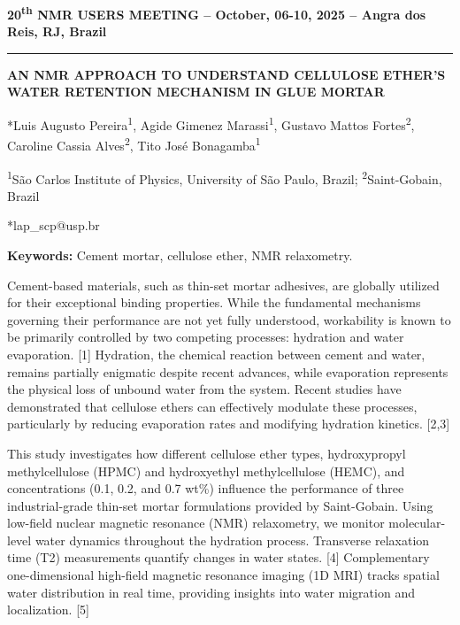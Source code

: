 \documentclass[10pt]{article}
\begin{document}
\centering
\textbf{20\textsuperscript{th} NMR USERS MEETING -- October, 06-10, 2025 -- Angra dos Reis, RJ, Brazil}

\noindent\rule{\textwidth}{0.4pt} %

\vspace{24pt}

\textbf{AN NMR APPROACH TO UNDERSTAND CELLULOSE ETHER’S WATER RETENTION MECHANISM IN GLUE MORTAR}

\vspace{12pt}

*Luis Augusto Pereira\textsuperscript{1}, Agide Gimenez Marassi\textsuperscript{1}, Gustavo Mattos Fortes\textsuperscript{2}, Caroline Cassia Alves\textsuperscript{2}, Tito José Bonagamba\textsuperscript{1}

\vspace{6pt}

\textsuperscript{1}São Carlos Institute of Physics, University of São Paulo, Brazil; \textsuperscript{2}Saint-Gobain, Brazil

*lap\_scp@usp.br

\vspace{12pt}
\begin{flushleft}
\textbf{Keywords:} Cement mortar, cellulose ether, NMR relaxometry.
\end{flushleft}

\vspace{12pt}
\begin{justify}
\quad Cement-based materials, such as thin-set mortar adhesives, are globally utilized for their exceptional binding properties. While the fundamental mechanisms governing their performance are not yet fully understood, workability is known to be primarily controlled by two competing processes: hydration and water evaporation. [1] Hydration, the chemical reaction between cement and water, remains partially enigmatic despite recent advances, while evaporation represents the physical loss of unbound water from the system. Recent studies have demonstrated that cellulose ethers can effectively modulate these processes, particularly by reducing evaporation rates and modifying hydration kinetics. [2,3]

This study investigates how different cellulose ether types, hydroxypropyl methylcellulose (HPMC) and hydroxyethyl methylcellulose (HEMC), and concentrations (0.1, 0.2, and 0.7 wt\%) influence the performance of three industrial-grade thin-set mortar formulations provided by Saint-Gobain. Using low-field nuclear magnetic resonance (NMR) relaxometry, we monitor molecular-level water dynamics throughout the hydration process. Transverse relaxation time (T2) measurements quantify changes in water states. [4] Complementary one-dimensional high-field magnetic resonance imaging (1D MRI) tracks spatial water distribution in real time, providing insights into water migration and localization. [5]
\end{justify}
\end{document}
